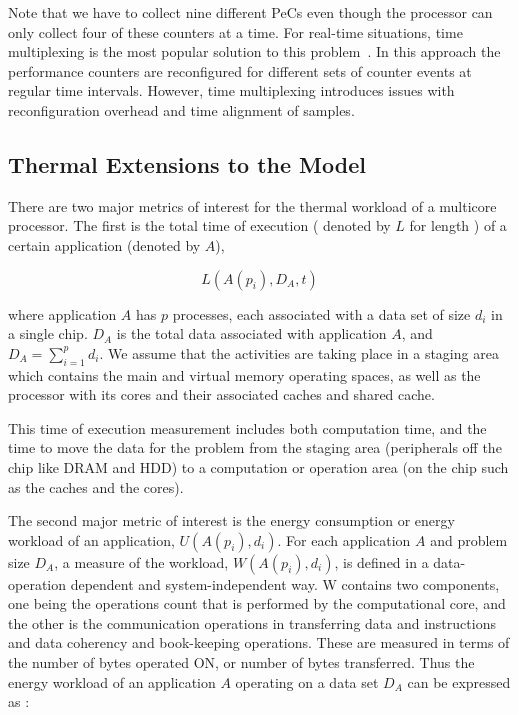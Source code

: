 \documentclass[times,10pt,onecolumn]{article}
\begin{document}
Note that we have to collect nine different PeCs even though the
processor can only collect four of these counters at a time.  For
real-time situations, time multiplexing is the most popular solution to
this problem~\cite{Azimi2005}. In this approach the performance
counters are reconfigured for different sets of counter events at
regular time intervals.  However, time multiplexing introduces issues
with reconfiguration overhead and time alignment of samples.

\subsection{Thermal  Extensions to the Model}
\label{sec:themalmodel}
There are two major metrics of interest for the thermal workload of a
multicore processor. The first is the total time of execution ( denoted
by $L$ for length ) of a certain application (denoted by $A$),

\begin{equation}
L(A(p_i),D_A,t)\nonumber
\end{equation}

where application $A$ has $p$ processes, each associated with a data set
of size $d_i$ in a single chip. $D_A$ is the total data associated with
application $A$, and $D_A = \sum_{i=1}^p{d_i}$.  We assume that the
activities are taking place in a staging area which contains the main
and virtual memory operating spaces, as well as the processor with its
cores and their associated caches and shared cache.

This time of execution measurement includes both computation time, and
the time to move the data for the problem from the staging area
(peripherals off the chip like DRAM and HDD) to a computation or
operation area (on the chip such as the caches and the cores).

The second major metric of interest is the energy consumption or energy
workload of an application, $U(A(p_i),d_i)$. For each application $A$
and problem size $D_A$, a measure of the workload, $W(A(p_i),d_i)$, is
defined in a data-operation dependent and system-independent way. W
contains two components, one being the operations count that is
performed by the computational core, and the other is the communication
operations in transferring data and instructions and data coherency and
book-keeping operations. These are measured in terms of the number of
bytes operated ON, or number of bytes transferred. Thus the energy
workload of an application $A$ operating on a data set $D_A$ can be
expressed as :
\end{document}

